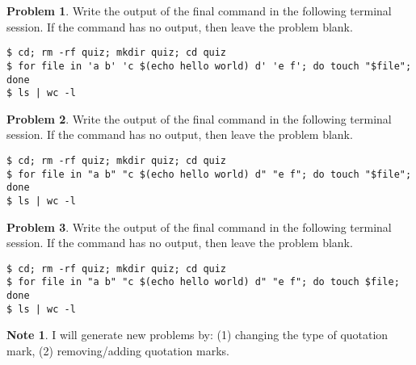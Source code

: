 \documentclass[10pt]{article}
\theoremstyle{definition}
\newtheorem{problem}{Problem}
\newtheorem{note}{Note}
\begin{document}
\filbreak\begin{problem}
    Write the output of the final command in the following terminal session.
    If the command has no output, then leave the problem blank.
\end{problem}
\begin{lstlisting}
$ cd; rm -rf quiz; mkdir quiz; cd quiz
$ for file in 'a b' 'c $(echo hello world) d' 'e f'; do touch "$file"; done
$ ls | wc -l
\end{lstlisting}
\vspace{0.4in}

\filbreak\begin{problem}
    Write the output of the final command in the following terminal session.
    If the command has no output, then leave the problem blank.
\end{problem}
\begin{lstlisting}
$ cd; rm -rf quiz; mkdir quiz; cd quiz
$ for file in "a b" "c $(echo hello world) d" "e f"; do touch "$file"; done
$ ls | wc -l
\end{lstlisting}
\vspace{0.4in}

\filbreak\begin{problem}
    Write the output of the final command in the following terminal session.
    If the command has no output, then leave the problem blank.
\end{problem}
\begin{lstlisting}
$ cd; rm -rf quiz; mkdir quiz; cd quiz
$ for file in "a b" "c $(echo hello world) d" "e f"; do touch $file; done
$ ls | wc -l
\end{lstlisting}
\vspace{0.4in}

\begin{note}
    I will generate new problems by:
    (1) changing the type of quotation mark,
    (2) removing/adding quotation marks.
\end{note}
\end{document}
